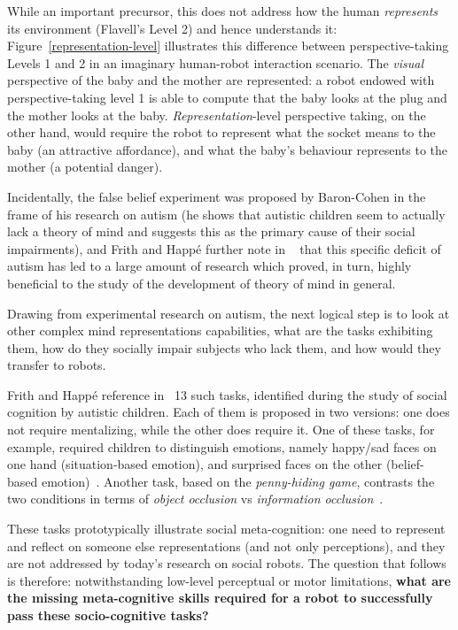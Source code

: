 \documentclass{sig-alternate}
\begin{document}
While an important precursor, this does not address how the human
\emph{represents} its environment (Flavell's Level 2) and hence understands it:
Figure~\ref{representation-level} illustrates this difference between
perspective-taking Levels 1 and 2 in an imaginary human-robot interaction
scenario. The \emph{visual} perspective of the baby and the mother are
represented: a robot endowed with perspective-taking level 1 is able to compute
that the baby looks at the plug and the mother looks at the baby.
\emph{Representation}-level perspective taking, on the other hand, would require
the robot to represent what the socket means to the baby (an attractive
affordance), and what the baby's behaviour represents to the mother (a potential
danger).


Incidentally, the false belief experiment was proposed by Baron-Cohen in the
frame of his research on autism (he shows that autistic children seem to
actually lack a theory of mind and suggests this as the primary cause of their
social impairments), and Frith and Happé further note in ~\cite{frith1994autism}
that this specific deficit of autism has led to a large amount of research which
proved, in turn, highly beneficial to the study of the development of theory of
mind in general.

Drawing from experimental research on autism, the next logical step is to look
at other complex mind representations capabilities, what are the tasks
exhibiting them, how do they socially impair subjects who lack them, and how
would they transfer to robots.

Frith and Happé reference in~\cite{frith1994autism} 13 such tasks, identified
during the study of social cognition by autistic children. Each of them is
proposed in two versions: one does not require mentalizing, while the other does
require it. One of these tasks, for example, required children to distinguish
emotions, namely happy/sad faces on one hand (situation-based emotion), and
surprised faces on the other (belief-based emotion)~\cite{baron1993children}.
Another task, based on the \emph{penny-hiding game}, contrasts the two
conditions in terms of \emph{object occlusion} vs \emph{information
occlusion}~\cite{baron1992out}.

These tasks prototypically illustrate social meta-cognition: one need to
represent and reflect on someone else representations (and not only
perceptions), and they are not addressed by today's research on social robots.
The question that follows is therefore: notwithstanding low-level perceptual or
motor limitations, \textbf{what are the missing meta-cognitive skills required
for a robot to successfully pass these socio-cognitive tasks?}
\end{document}
